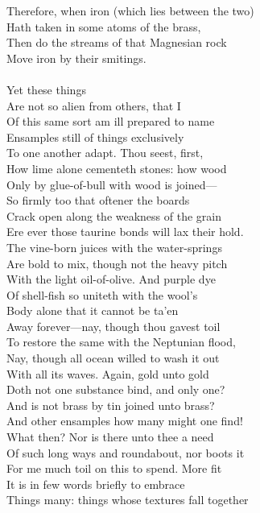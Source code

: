 Therefore, when iron (which lies between the two)\\
Hath taken in some atoms of the brass,\\
Then do the streams of that Magnesian rock\\
Move iron by their smitings.\\
\\
Yet these things\\
Are not so alien from others, that I\\
Of this same sort am ill prepared to name\\
Ensamples still of things exclusively\\
To one another adapt. Thou seest, first,\\
How lime alone cementeth stones: how wood\\
Only by glue-of-bull with wood is joined—\\
So firmly too that oftener the boards\\
Crack open along the weakness of the grain\\
Ere ever those taurine bonds will lax their hold.\\
The vine-born juices with the water-springs\\
Are bold to mix, though not the heavy pitch\\
With the light oil-of-olive. And purple dye\\
Of shell-fish so uniteth with the wool's\\
Body alone that it cannot be ta'en\\
Away forever—nay, though thou gavest toil\\
To restore the same with the Neptunian flood,\\
Nay, though all ocean willed to wash it out\\
With all its waves. Again, gold unto gold\\
Doth not one substance bind, and only one?\\
And is not brass by tin joined unto brass?\\
And other ensamples how many might one find!\\
What then? Nor is there unto thee a need\\
Of such long ways and roundabout, nor boots it\\
For me much toil on this to spend. More fit\\
It is in few words briefly to embrace\\
Things many: things whose textures fall together\\
